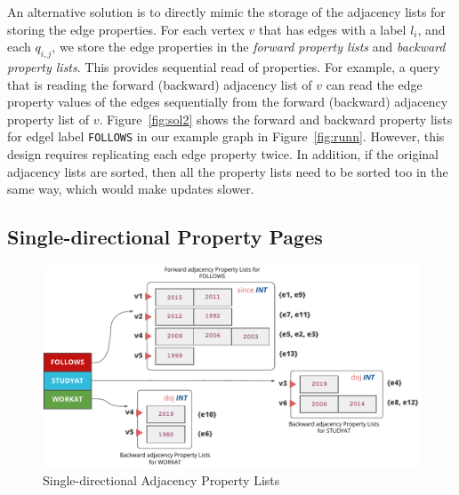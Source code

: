  An alternative solution is to directly mimic the storage of the adjacency lists for storing the edge properties. For each vertex $v$ that has edges with a label $l_i$, and each $q_{i,j}$, we store the edge properties in the \emph{forward property lists} and \emph{backward property lists}. This provides sequential read of properties. For example, a query that is reading the forward (backward) adjacency list of $v$ can read the edge property values of the edges sequentially from the forward (backward) adjacency property list of $v$. Figure~\ref{fig:sol2} shows the forward and backward property lists for edgel label \texttt{FOLLOWS} in our example graph in Figure~\ref{fig:runn}. However, this design requires replicating each edge property twice. In addition, if the original adjacency lists are sorted, then all the property lists need to be sorted too in the same way, which would make updates slower. 

\subsection{Single-directional Property Pages}

\begin{figure}
	\hfill\includegraphics[scale=0.78]{img/single-dir-prop-list}\hspace*{\fill}
	\captionsetup{justification=centering}
	\caption{Single-directional Adjacency Property Lists}
	\label{fig:single-dir-prop-list}
\end{figure}

